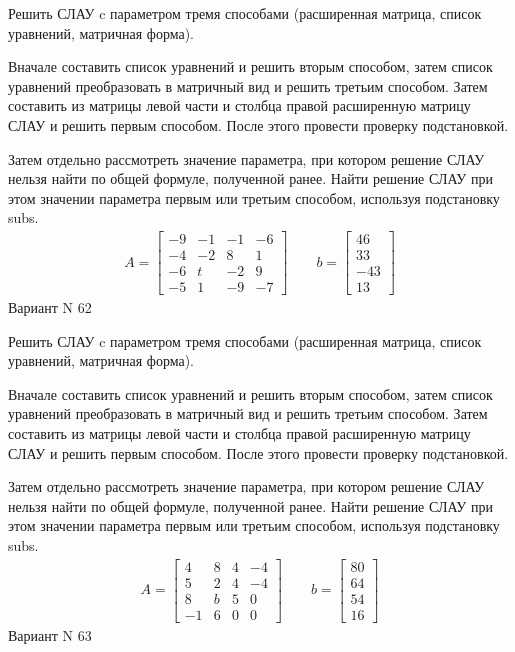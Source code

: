 \documentclass[11pt]{report}
\begin{document}
Решить СЛАУ c параметром тремя способами (расширенная матрица, список уравнений, матричная форма).

Вначале составить список уравнений и решить вторым способом,
затем список уравнений преобразовать в матричный вид и решить третьим способом.
Затем составить из матрицы левой части и столбца правой расширенную матрицу СЛАУ и решить первым способом.
После этого провести проверку подстановкой.

Затем отдельно рассмотреть значение параметра, при котором решение СЛАУ нельзя найти по общей формуле,
полученной ранее.
Найти решение СЛАУ при этом значении параметра первым или третьим способом, используя подстановку subs.
\begin{align*}
    A = \left[\begin{matrix}-9 & -1 & -1 & -6\\-4 & -2 & 8 & 1\\-6 & t & -2 & 9\\-5 & 1 & -9 & -7\end{matrix}\right]
\qquad b = \left[\begin{matrix}46\\33\\-43\\13\end{matrix}\right]
\end{align*}
\newpage
Вариант N 62


Решить СЛАУ c параметром тремя способами (расширенная матрица, список уравнений, матричная форма).

Вначале составить список уравнений и решить вторым способом,
затем список уравнений преобразовать в матричный вид и решить третьим способом.
Затем составить из матрицы левой части и столбца правой расширенную матрицу СЛАУ и решить первым способом.
После этого провести проверку подстановкой.

Затем отдельно рассмотреть значение параметра, при котором решение СЛАУ нельзя найти по общей формуле,
полученной ранее.
Найти решение СЛАУ при этом значении параметра первым или третьим способом, используя подстановку subs.
\begin{align*}
    A = \left[\begin{matrix}4 & 8 & 4 & -4\\5 & 2 & 4 & -4\\8 & b & 5 & 0\\-1 & 6 & 0 & 0\end{matrix}\right]
\qquad b = \left[\begin{matrix}80\\64\\54\\16\end{matrix}\right]
\end{align*}
\newpage
Вариант N 63
\end{document}

